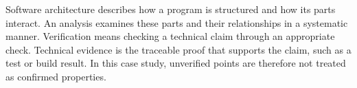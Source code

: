 \begin{beginnerstatement}

Software architecture describes how a program is structured and how its parts
interact. An analysis examines these parts and their relationships in a
systematic manner. Verification means checking a technical claim through an
appropriate check. Technical evidence is the traceable proof that supports
the claim, such as a test or build result. In this case study, unverified points
are therefore not treated as confirmed properties.

\end{beginnerstatement}
